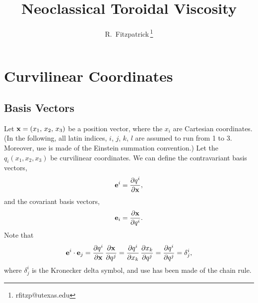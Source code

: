 \documentclass[12pt,prb,aps,notitlepage]{revtex4-1}
\begin{document}
\title{Neoclassical Toroidal Viscosity}
\author{R.~Fitzpatrick\,\footnote{rfitzp@utexas.edu}}
\begin{abstract}
\end{abstract}
\maketitle

\section{Curvilinear Coordinates}
\subsection{Basis Vectors} 
Let ${\bf x}=(x_1,\,x_2,\,x_3)$ be a position vector, where the $x_i$ are Cartesian coordinates.  (In the following, all latin indices, $i$, $j$, $k$, $l$ are assumed to run from 1 to 3. Moreover,
use is made of the Einstein summation convention.)
Let the $q_i(x_1,x_2,x_3)$ be curvilinear coordinates. We can define the contravariant basis vectors,
\begin{equation}\label{e1}
{\bf e}^i = \frac{\partial q^i}{\partial {\bf x}},
\end{equation}
and the covariant basis vectors, 
\begin{equation}\label{e2}
{\bf e}_i = \frac{\partial {\bf x}}{\partial q^i}.
\end{equation}
Note that
\begin{equation}\label{e3}
{\bf e}^i\cdot{\bf e}_j = \frac{\partial q^i}{\partial {\bf x}}\,\frac{\partial {\bf x}}{\partial q^j}= \frac{\partial q^i}{\partial x_k}\,\frac{\partial x_k}{\partial q^j}=
\frac{\partial q^i}{\partial q^j} = \delta^i_j,
\end{equation}
where  $\delta^i_j$ is the Kronecker delta symbol, and use has been made of the chain rule. 
\end{document}
